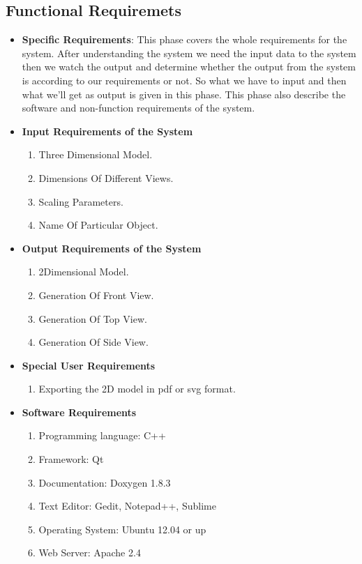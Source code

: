 \subsection{Functional Requiremets}
\begin{itemize}
\item {\bf Specific Requirements}: This phase covers the whole requirements 
for the system. After understanding the system we need the input data 
to the system then we watch the output and determine whether the output 
from the system is according to our requirements or not. So what we have 
to input and then what we’ll get as output is given in this phase. This 
phase also describe the software and non-function requirements of the 
system.
\item {\bf Input Requirements of the System}
\begin{enumerate} 
\item Three Dimensional Model.
\item Dimensions Of Different Views.
\item Scaling Parameters.
\item Name Of Particular Object.
\end{enumerate}
\vskip 0.5cm
\item {\bf Output Requirements of the System}
\begin{enumerate} 
\item 2Dimensional Model.
\item Generation Of Front View.
\item Generation Of Top View.
\item Generation Of Side View.
\end{enumerate}
\vskip 0.5cm
\item {\bf Special User Requirements}
\begin{enumerate} 
\item Exporting the 2D model in pdf or svg format.
\end{enumerate}
\vskip 0.5cm
\item {\bf Software Requirements}
\begin{enumerate} 
\item Programming language: C++
\item Framework: Qt
\item Documentation: Doxygen 1.8.3
\item Text Editor: Gedit, Notepad++, Sublime
\item Operating System: Ubuntu 12.04 or up
\item Web Server: Apache 2.4
\end{enumerate}
\end{itemize}
